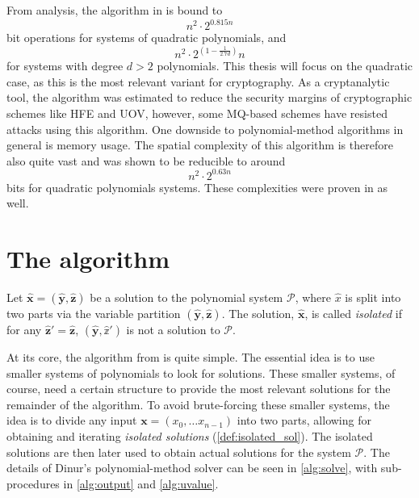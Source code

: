 From analysis, the algorithm in \cite{eurocrypt-2021-30841} is bound to 
$$
    n^2 \cdot 2^{0.815n}
$$ 
bit operations for systems of quadratic polynomials, and 
$$
    n^2 \cdot 2^{(1 - \frac{1}{2.7d})}n
$$ 
for systems with degree $d > 2$ polynomials. This thesis will focus on the quadratic case, as this is the most relevant variant for cryptography. As a cryptanalytic tool, the algorithm was estimated to reduce the security margins of cryptographic schemes like HFE and UOV, however, some MQ-based schemes have resisted attacks using this algorithm. One downside to polynomial-method algorithms in general is memory usage. The spatial complexity of this algorithm is therefore also quite vast and was shown to be reducible to around 
$$
    n^2 \cdot 2^{0.63n}
$$ 
bits for quadratic polynomials systems. These complexities were proven in \cite{eurocrypt-2021-30841} as well.

\section{The algorithm} \label{sec:dinur:dinur_alg}
\begin{defn} \label{def:isolated_sol}
    Let $\hat{\mathbf{x}} = (\hat{\mathbf{y}}, \hat{\mathbf{z}})$ be a solution to the polynomial system $\mathcal{P}$, where $\hat{x}$ is split into two parts via the variable partition $(\hat{\mathbf{y}}, \hat{\mathbf{z}})$. The solution, $\hat{\mathbf{x}}$, is called \textit{isolated} if for any $\hat{\mathbf{z}}' = \hat{\mathbf{z}}$, $(\hat{\mathbf{y}}, \hat{\mathbb{z}}')$ is not a solution to $\mathcal{P}$.
\end{defn}

At its core, the algorithm from \cite{eurocrypt-2021-30841} is quite simple. The essential idea is to use smaller systems of polynomials to look for solutions. These smaller systems, of course, need a certain structure to provide the most relevant solutions for the remainder of the algorithm. To avoid brute-forcing these smaller systems, the idea is to divide any input $\mathbf{x} = (x_0, \dots x_{n - 1})$ into two parts, allowing for obtaining and iterating \textit{isolated solutions} (\cref{def:isolated_sol}). The isolated solutions are then later used to obtain actual solutions for the system $\mathcal{P}$. The details of Dinur's polynomial-method solver can be seen in \cref{alg:solve}, with sub-procedures in \cref{alg:output} and \cref{alg:uvalue}.

